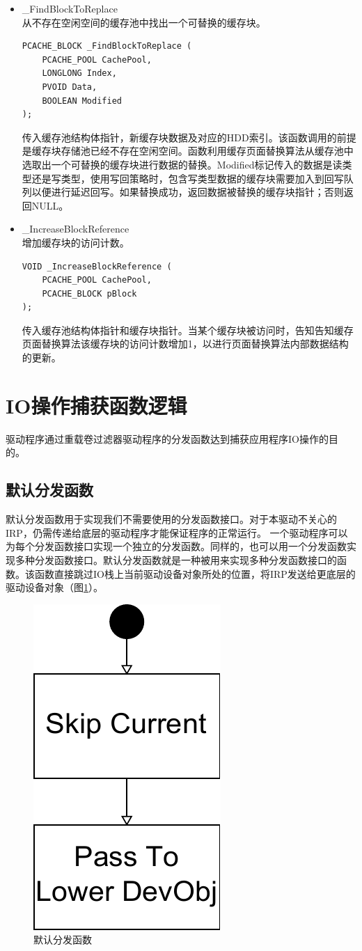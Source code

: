 \begin{itemize}
\item \_FindBlockToReplace
\\从不存在空闲空间的缓存池中找出一个可替换的缓存块。
\begin{lstlisting}
PCACHE_BLOCK _FindBlockToReplace (
    PCACHE_POOL CachePool,
    LONGLONG Index,
    PVOID Data,
    BOOLEAN Modified
);
\end{lstlisting}
传入缓存池结构体指针，新缓存块数据及对应的HDD索引。该函数调用的前提是缓存块存储池已经不存在空闲空间。函数利用缓存页面替换算法从缓存池中选取出一个可替换的缓存块进行数据的替换。Modified标记传入的数据是读类型还是写类型，使用写回策略时，包含写类型数据的缓存块需要加入到回写队列以便进行延迟回写。如果替换成功，返回数据被替换的缓存块指针；否则返回NULL。

\item \_IncreaseBlockReference
\\增加缓存块的访问计数。
\begin{lstlisting}
VOID _IncreaseBlockReference (
    PCACHE_POOL CachePool,
    PCACHE_BLOCK pBlock
);
\end{lstlisting}
传入缓存池结构体指针和缓存块指针。当某个缓存块被访问时，告知告知缓存页面替换算法该缓存块的访问计数增加1，以进行页面替换算法内部数据结构的更新。

\end{itemize}


\section{IO操作捕获函数逻辑}
\label{sec:capture_io_logic}

驱动程序通过重载卷过滤器驱动程序的分发函数达到捕获应用程序IO操作的目的。

\subsection{默认分发函数}

默认分发函数用于实现我们不需要使用的分发函数接口。对于本驱动不关心的IRP，仍需传递给底层的驱动程序才能保证程序的正常运行。
一个驱动程序可以为每个分发函数接口实现一个独立的分发函数。同样的，也可以用一个分发函数实现多种分发函数接口。默认分发函数就是一种被用来实现多种分发函数接口的函数。该函数直接跳过IO栈上当前驱动设备对象所处的位置，将IRP发送给更底层的驱动设备对象（图\ref{fig:df-default}）。

\begin{figure}[H]
\centering
\includegraphics[width=0.2\linewidth]{./graph/df-default}
\caption{默认分发函数}
\label{fig:df-default}
\end{figure}

